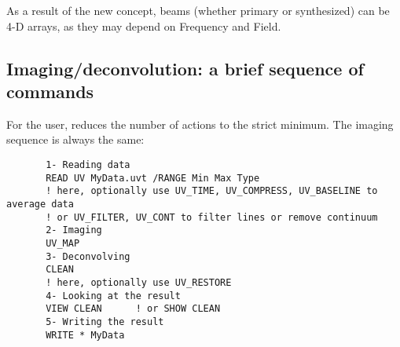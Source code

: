 As a result of the new concept, beams (whether primary or synthesized) 
can be 4-D arrays, as they may depend on Frequency and Field.

\subsection{Imaging/deconvolution: a brief sequence of commands}
For the user, \imager{} reduces the number of actions to the strict minimum. 
The imaging sequence is always the same: 
\begin{verbatim}
       1- Reading data
       READ UV MyData.uvt /RANGE Min Max Type
       ! here, optionally use UV_TIME, UV_COMPRESS, UV_BASELINE to average data
       ! or UV_FILTER, UV_CONT to filter lines or remove continuum
       2- Imaging
       UV_MAP         
       3- Deconvolving
       CLEAN           
       ! here, optionally use UV_RESTORE
       4- Looking at the result
       VIEW CLEAN      ! or SHOW CLEAN     
       5- Writing the result 
       WRITE * MyData  
\end{verbatim}

